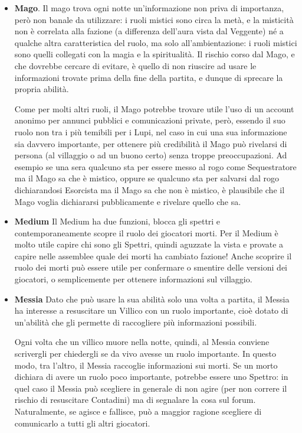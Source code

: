 \documentclass[a4paper,10pt]{article}
\begin{document}
\begin{itemize}
	\item {\bf Mago}. Il mago trova ogni notte un'informazione non priva di importanza, però non banale da utilizzare: i ruoli mistici sono circa la metà, e la misticità non è correlata alla fazione (a differenza dell'aura vista dal Veggente) né a qualche altra caratteristica del ruolo, ma solo all'ambientazione: i ruoli mistici sono quelli collegati con la magia e la spiritualità. Il rischio corso dal Mago, e che dovrebbe cercare di evitare, è quello di non riuscire ad usare le informazioni trovate prima della fine della partita, e dunque di sprecare la propria abilità.
	
	Come per molti altri ruoli, il Mago potrebbe trovare utile l'uso di un account anonimo per annunci pubblici e comunicazioni private, però, essendo il suo ruolo non tra i più temibili per i Lupi, nel caso in cui una sua informazione sia davvero importante, per ottenere più credibilità il Mago può rivelarsi di persona (al villaggio o ad un buono certo) senza troppe preoccupazioni. Ad esempio se una sera qualcuno sta per essere messo al rogo come Sequestratore ma il Mago sa che è mistico, oppure se qualcuno sta per salvarsi dal rogo dichiarandosi Esorcista ma il Mago sa che non è mistico, è plausibile che il Mago voglia dichiararsi pubblicamente e rivelare quello che sa.

	\item {\bf Medium} Il Medium ha due funzioni, blocca gli spettri e contemporaneamente scopre il ruolo dei giocatori morti. Per il Medium è molto utile capire chi sono gli Spettri, quindi aguzzate la vista e provate a capire nelle assemblee quale dei morti ha cambiato fazione! Anche scoprire il ruolo dei morti può essere utile per confermare o smentire delle versioni dei giocatori, o semplicemente per ottenere informazioni sul villaggio.

	\item {\bf Messia} Dato che può usare la sua abilità solo una volta a partita, il Messia ha interesse a resuscitare un Villico con un ruolo importante, cioè dotato di un’abilità che gli permette di raccogliere più informazioni possibili. 
	
	Ogni volta che un villico muore nella notte, quindi, al Messia conviene scrivergli per chiedergli se da vivo avesse un ruolo importante. In questo modo, tra l’altro, il Messia raccoglie informazioni sui morti. Se un morto dichiara di avere un ruolo poco importante, potrebbe essere uno Spettro: in quel caso il Messia può scegliere in generale di non agire (per non correre il rischio di resuscitare Contadini) ma di segnalare la cosa sul forum. Naturalmente, se agisce e fallisce, può a maggior ragione scegliere di comunicarlo a tutti gli altri giocatori.
	

\end{itemize}
\end{document}
